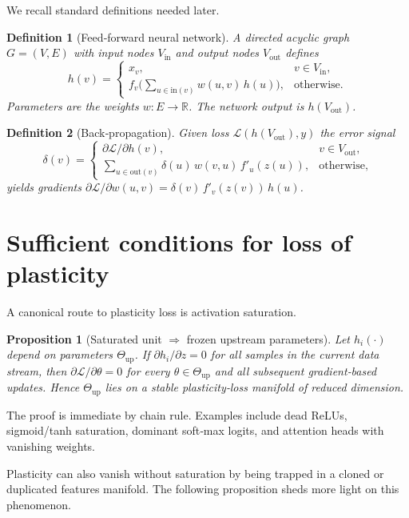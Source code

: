 \documentclass{article}
\newcommand{\Loss}{\mathcal{L}}
\newcommand{\R}{\mathbb{R}}
\newtheorem{definition}{Definition}[section]
\newtheorem{proposition}{Proposition}[section]
\begin{document}
We recall standard definitions needed later.

\begin{definition}[Feed‑forward neural network]
A directed acyclic graph $G=(V,E)$ with input nodes $V_{\text{in}}$ and output nodes $V_{\text{out}}$ defines
\[
h(v)=
\begin{cases}
x_v, & v\in V_{\text{in}},\\
f_v\!\bigl(\sum_{u\!\in\!\mathrm{in}(v)}w(u,v)\,h(u)\bigr), &\text{otherwise}.
\end{cases}
\]
Parameters are the weights $w:E\to\R$.  The network output is $h(V_{\text{out}})$.
\end{definition}

\begin{definition}[Back‑propagation]
Given loss $\Loss(h(V_{\text{out}}),y)$ the error signal
\[
\delta(v)=
\begin{cases}
\partial\Loss/\partial h(v), & v\in V_{\text{out}},\\[4pt]
\displaystyle\sum_{u\in\mathrm{out}(v)}\delta(u)\,w(v,u)\,f'_u(z(u)), &\text{otherwise},
\end{cases}
\]
yields gradients $\partial\Loss/\partial w(u,v)=\delta(v)\,f'_v(z(v))\,h(u)$.\qedhere
\end{definition}

\section{Sufficient conditions for loss of plasticity}
\label{sec:frozen}

A canonical route to plasticity loss is activation saturation.

\begin{proposition}[Saturated unit $\Rightarrow$ frozen upstream parameters]
\label{prop:saturated}
Let $h_i(\cdot)$ depend on parameters $\Theta_{\text{up}}$.  If
\(
\partial h_i/\partial z = 0
\)
for all samples in the current data stream, then
\(
\partial\Loss/\partial\theta = 0
\)
for every $\theta\in\Theta_{\text{up}}$ and all subsequent gradient‑based updates.  Hence $\Theta_{\text{up}}$ lies on a stable plasticity‑loss manifold of reduced dimension.
\end{proposition}

The proof is immediate by chain rule. Examples include dead ReLUs, sigmoid/tanh saturation, dominant soft‑max logits, and attention heads with vanishing weights.

Plasticity can also vanish without saturation by being trapped in a cloned or duplicated features manifold. The following proposition sheds more light on this phenomenon.
\end{document}
